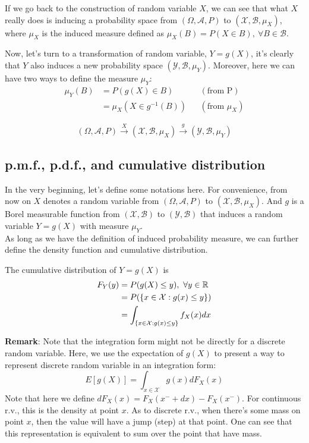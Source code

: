 \documentclass[11pt]{article}
\begin{document}
If we go back to the construction of random variable $X$, we can see that what $X$ really does is inducing a probability space from $(\Omega,\mathcal{A},P)$ to $(\mathcal{X},\mathcal{B},\mu_X)$, where $\mu_X$ is the induced measure defined as $\mu_X(B) = P(X\in B),\ \forall B\in\mathcal{B}$.

Now, let's turn to a transformation of random variable, $Y = g(X)$, it's clearly that $Y$ also induces a new probability space $(\mathcal{Y},\mathcal{B},\mu_Y)$. Moreover, here we can have two ways to define the measure $\mu_Y$:
\begin{align*}
\mu_Y(B) &= P(g(X)\in B) && (\mbox{from P})\\
&=\mu_X(X\in g^{-1}(B)) && (\mbox{from $\mu_X$})
\end{align*}

\begin{intuition}[transformation]
	$$(\Omega,\mathcal{A},P)\xrightarrow{X}(\mathcal{X},\mathcal{B},\mu_X)\xrightarrow{g}(\mathcal{Y},\mathcal{B},\mu_Y)$$
\end{intuition}

\subsection{p.m.f., p.d.f., and cumulative distribution}
In the very beginning, let's define some notations here. For convenience, from now on $X$ denotes a random variable from $(\Omega,\mathcal{A},P)$ to $(\mathcal{X},\mathcal{B},\mu_X)$. And $g$ is a Borel measurable function from $(\mathcal{X},\mathcal{B})$ to $(\mathcal{Y},\mathcal{B})$ that induces a random variable $Y=g(X)$ with measure $\mu_Y$.\\

As long as we have the definition of induced probability measure, we can further define the density function and cumulative distribution.
\begin{property}
	The cumulative distribution of $Y=g(X)$ is
	\begin{align*}
	F_Y(y) &= P(g(X)\leq y),\ \forall y\in{\mathbb R}\\
	&=P(\{x\in\mathcal{X}: g(x)\leq y \})\\
	&=\int_{\{x\in\mathcal{X}: g(x)\leq y \}} f_X(x)dx
	\end{align*}
\end{property}

{\bf Remark}: Note that the integration form might not be directly for a discrete random variable. Here, we use the expectation of $g(X)$ to present a way to represent discrete random variable in an integration form:
$$E[g(X)] = \int_{x\in\mathcal{X}} g(x)dF_X(x)$$
Note that here we define $dF_X(x) = F_X(x^-+dx)-F_X(x^-)$. For continuous r.v., this is the density at point $x$. As to discrete r.v., when there's some mass on point $x$, then the value will have a jump (step) at that point. One can see that this representation is equivalent to sum over the point that have mass.\\
\end{document}
